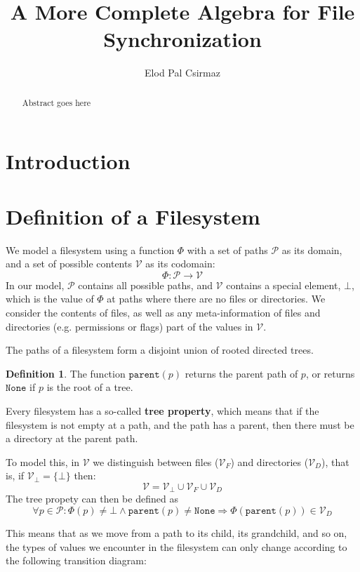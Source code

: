 \documentclass[12pt]{article}
\title{A More Complete Algebra for File Synchronization}
\author{Elod Pal Csirmaz}
\newcommand{\setv}{\mathcal{V}}
\newcommand{\setvx}[1]{\mathcal{V}_{#1}}
\newcommand{\setf}{\setvx{F}}
\newcommand{\setd}{\setvx{D}}
\newcommand{\setb}{\setvx{\empt}}
\newcommand{\setp}{\mathcal{P}}
\newcommand{\empt}{\bot}
\newcommand{\parent}{\mathtt{parent}}
\newcommand{\toppath}{\mathtt{None}} %
\newcommand{\FS}{\Phi} %
\theoremstyle{definition}
\newtheorem{mydef}{Definition}
\begin{document}
\maketitle
\begin{abstract}
Abstract goes here
\end{abstract}

\section{Introduction}


\section{Definition of a Filesystem}

We model a filesystem using a function $\FS$ with a set of paths $\setp$ as its domain,
and a set of possible contents $\setv$ as its codomain:
\[ \FS : \setp \rightarrow \setv \] 
In our model, $\setp$ contains all possible paths, and $\setv$ contains a special
element, $\empt$, which is the value of $\FS$ at paths where there are no files
or directories.
We consider the contents of files, as well as any meta-information of files
and directories (e.g. permissions or flags) part of the values in $\setv$.

The paths of a filesystem form a disjoint union of rooted directed trees.
\begin{mydef}
The function $\parent(p)$ returns the parent path of $p$, or
returns $\toppath$ if $p$ is the root of a tree.
\end{mydef}

Every filesystem has a so-called \textbf{tree property}, which means that
if the filesystem is not empty at a path, and the path has a parent,
then there must be a directory at the parent path.

To model this, in $\setv$ we distinguish between files ($\setf$) and directories ($\setd$), that is,
if $\setb = \{\empt\}$ then:
\[ \setv = \setb \cup \setf \cup \setd \]
The tree propety can then be defined as
\[ \forall p\in\setp : \FS(p) \neq \empt \wedge \parent(p) \neq \toppath \Rightarrow \FS(\parent(p)) \in \setd \]

This means that as we move from a path to its child, its grandchild, and so on,
the types of values we encounter in the filesystem can only change according to the following
transition diagram:
\end{document}

